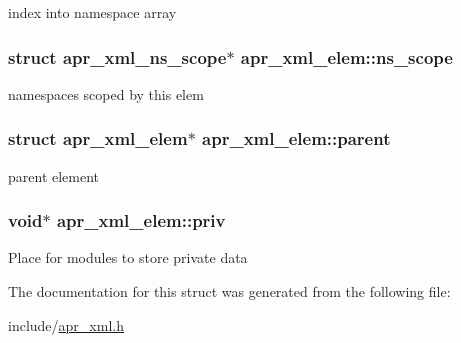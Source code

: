 index into namespace array \hypertarget{structapr__xml__elem_addfd70c22965dca4f7574639424a0c32}{
\subsubsection[{ns\-\_\-scope}]{\setlength{\rightskip}{0pt plus 5cm}struct apr\-\_\-xml\-\_\-ns\-\_\-scope$\ast$ apr\-\_\-xml\-\_\-elem\-::ns\-\_\-scope}}\label{structapr__xml__elem_addfd70c22965dca4f7574639424a0c32}
namespaces scoped by this elem \hypertarget{structapr__xml__elem_a0fd30b383f2659a9ef245c2e99cb707d}{
\subsubsection[{parent}]{\setlength{\rightskip}{0pt plus 5cm}struct {\bf apr\-\_\-xml\-\_\-elem}$\ast$ apr\-\_\-xml\-\_\-elem\-::parent}}\label{structapr__xml__elem_a0fd30b383f2659a9ef245c2e99cb707d}
parent element \hypertarget{structapr__xml__elem_a0bc4296aedb5d047325f86080604d939}{
\subsubsection[{priv}]{\setlength{\rightskip}{0pt plus 5cm}void$\ast$ apr\-\_\-xml\-\_\-elem\-::priv}}\label{structapr__xml__elem_a0bc4296aedb5d047325f86080604d939}
Place for modules to store private data 

The documentation for this struct was generated from the following file\-:\begin{DoxyCompactItemize}
\item 
include/\hyperlink{apr__xml_8h}{apr\-\_\-xml.\-h}\end{DoxyCompactItemize}
